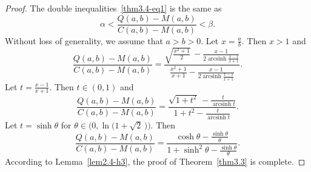 \documentclass[reqno,a4paper]{amsart}
\numberwithin{equation}{section}
\theoremstyle{plain}
\theoremstyle{remark}
\begin{document}
\begin{proof}
The double inequalities~\eqref{thm3.4-eq1} is the same as
\begin{equation*}
\alpha<\frac{Q(a,b)-M(a,b)}{C(a,b)-M(a,b)}<\beta.
\end{equation*}
Without loss of generality, we assume that $a>b>0$. Let $x=\frac{a}b$. Then $x>1$ and
\begin{equation*}
\frac{Q(a,b)-M(a,b)}{C(a,b)-M(a,b)}=\frac{\sqrt{\frac{x^2+1}2}\,-\frac{x-1}{2\operatorname{arcsinh}{\frac{x-1}{x+1}}}
}{\frac{x^2+1}{x+1}-\frac{x-1}{2\operatorname{arcsinh}{\frac{x-1}{x+1}}}}.
\end{equation*}
Let $t=\frac{x-1}{x+1}$. Then $t\in(0,1)$ and
\begin{equation*}
\frac{Q(a,b)-M(a,b)}{C(a,b)-M(a,b)}=\frac{\sqrt{1+t^2}\,-\frac{t}{\operatorname{arcsinh}{t}}}{1+t^2-\frac{t}{\operatorname{arcsinh}{t}}}.
\end{equation*}
Let $t=\sinh\theta $ for $\theta\in\bigl(0,\ln\bigl(1+\sqrt2\,\bigr)\bigr)$. Then
\begin{equation*}
\frac{Q(a,b)-M(a,b)}{C(a,b)-M(a,b)}
=\frac{\cosh\theta-\frac{\sinh\theta}\theta}{1+\sinh^2\theta-\frac{\sinh\theta}\theta}.
\end{equation*}
According to Lemma~\ref{lem2.4-h3}, the proof of Theorem~\ref{thm3.3} is complete.
\end{proof}
\end{document}
